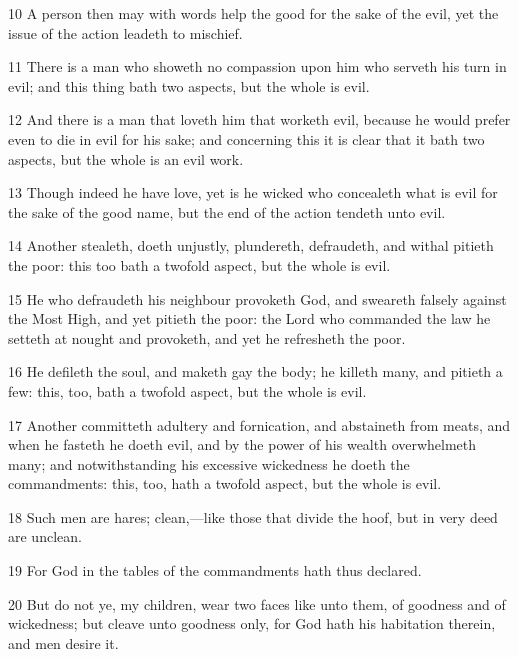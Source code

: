 \par 10 A person then may with words help the good for the sake of the evil, yet the issue of the action leadeth to mischief.

\par 11 There is a man who showeth no compassion upon him who serveth his turn in evil; and this thing bath two aspects, but the whole is evil.

\par 12 And there is a man that loveth him that worketh evil, because he would prefer even to die in evil for his sake; and concerning this it is clear that it bath two aspects, but the whole is an evil work.

\par 13 Though indeed he have love, yet is he wicked who concealeth what is evil for the sake of the good name, but the end of the action tendeth unto evil.

\par 14 Another stealeth, doeth unjustly, plundereth, defraudeth, and withal pitieth the poor: this too bath a twofold aspect, but the whole is evil.

\par 15 He who defraudeth his neighbour provoketh God, and sweareth falsely against the Most High, and yet pitieth the poor: the Lord who commanded the law he setteth at nought and provoketh, and yet he refresheth the poor.

\par 16 He defileth the soul, and maketh gay the body; he killeth many, and pitieth a few: this, too, bath a twofold aspect, but the whole is evil.

\par 17 Another committeth adultery and fornication, and abstaineth from meats, and when he fasteth he doeth evil, and by the power of his wealth overwhelmeth many; and notwithstanding his excessive wickedness he doeth the commandments: this, too, hath a twofold aspect, but the whole is evil.

\par 18 Such men are hares; clean,—like those that divide the hoof, but in very deed are unclean.

\par 19 For God in the tables of the commandments hath thus declared.

\par 20 But do not ye, my children, wear two faces like unto them, of goodness and of wickedness; but cleave unto goodness only, for God hath his habitation therein, and men desire it.

